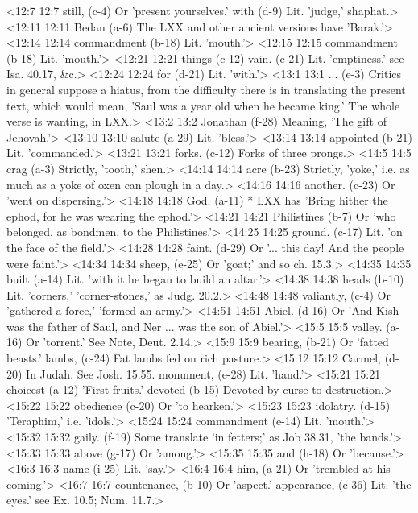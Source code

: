 <12:7 12:7  still, (c-4)  Or 'present yourselves.'
  with (d-9)  Lit. 'judge,' shaphat.>
<12:11 12:11  Bedan (a-6)  The LXX and other ancient versions have 'Barak.'>
<12:14 12:14  commandment (b-18)  Lit. 'mouth.'>
<12:15 12:15  commandment (b-18)  Lit. 'mouth.'>
<12:21 12:21  things (c-12)  vain. (c-21)
  Lit. 'emptiness.' see Isa. 40.17, &c.>
<12:24 12:24  for (d-21)  Lit. 'with.'>
<13:1 13:1  ... (e-3)  Critics in general suppose a hiatus, from the difficulty  there is in translating the present text, which would mean,  'Saul was a year old when he became king.' The whole verse is  wanting, in LXX.>
<13:2 13:2  Jonathan (f-28)  Meaning, 'The gift of Jehovah.'>
<13:10 13:10  salute (a-29)  Lit. 'bless.'>
<13:14 13:14  appointed (b-21)  Lit. 'commanded.'>
<13:21 13:21  forks, (c-12)  Forks of three prongs.>
<14:5 14:5  crag (a-3)  Strictly, 'tooth,' shen.>
<14:14 14:14  acre (b-23)  Strictly, 'yoke,' i.e. as much as a yoke of oxen can plough  in a day.>
<14:16 14:16  another. (c-23)  Or 'went on dispersing.'>
<14:18 14:18  God. (a-11)  * LXX has 'Bring hither the ephod, for he was wearing the  ephod.'>
<14:21 14:21  Philistines (b-7)  Or 'who belonged, as bondmen, to the Philistines.'>
<14:25 14:25  ground. (c-17)  Lit. 'on the face of the field.'>
<14:28 14:28  faint. (d-29)  Or '... this day! And the people were faint.'>
<14:34 14:34  sheep, (e-25)  Or 'goat;' and so ch. 15.3.>
<14:35 14:35  built (a-14)  Lit. 'with it he began to build an altar.'>
<14:38 14:38  heads (b-10)  Lit. 'corners,' 'corner-stones,' as Judg. 20.2.>
<14:48 14:48  valiantly, (c-4)  Or 'gathered a force,' 'formed an army.'>
<14:51 14:51  Abiel. (d-16)  Or 'And Kish was the father of Saul, and Ner ... was the  son of Abiel.'>
<15:5 15:5  valley. (a-16)  Or 'torrent.' See Note, Deut. 2.14.>
<15:9 15:9  bearing, (b-21)  Or 'fatted beasts.'
  lambs, (c-24)  Fat lambs fed on rich pasture.>
<15:12 15:12  Carmel, (d-20)  In Judah. See Josh. 15.55.
  monument, (e-28)  Lit. 'hand.'>
<15:21 15:21  choicest (a-12)  'First-fruits.'
  devoted (b-15)  Devoted by curse to destruction.>
<15:22 15:22  obedience (c-20)  Or 'to hearken.'>
<15:23 15:23  idolatry. (d-15)  'Teraphim,' i.e. 'idols.'>
<15:24 15:24  commandment (e-14)  Lit. 'mouth.'>
<15:32 15:32  gaily. (f-19)  Some translate 'in fetters;' as Job 38.31, 'the bands.'>
<15:33 15:33  above (g-17)  Or 'among.'>
<15:35 15:35  and (h-18)  Or 'because.'>
<16:3 16:3  name (i-25)  Lit. 'say.'>
<16:4 16:4  him, (a-21)  Or 'trembled at his coming.'>
<16:7 16:7  countenance, (b-10)  Or 'aspect.'
  appearance, (c-36)  Lit. 'the eyes.' see Ex. 10.5; Num. 11.7.>
